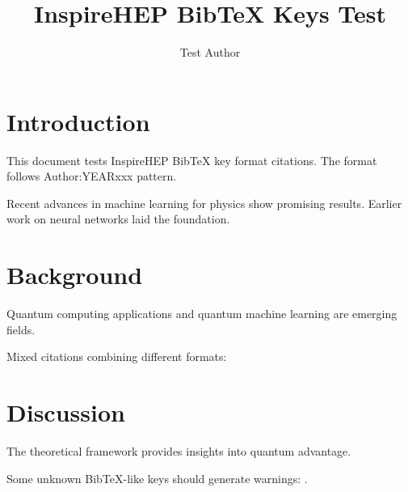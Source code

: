 \documentclass{article}
\title{InspireHEP BibTeX Keys Test}
\author{Test Author}
\begin{document}
\maketitle

\section{Introduction}

This document tests InspireHEP BibTeX key format citations. The format follows Author:YEARxxx pattern.

Recent advances in machine learning for physics \cite{Dumitrescu:2025vfp} show promising results. Earlier work on neural networks \cite{Carleo:2019ptp} laid the foundation.

\section{Background}

Quantum computing applications \cite{Preskill:2018fag} and quantum machine learning \cite{Biamonte:2017zfb} are emerging fields.

Mixed citations combining different formats:
\cite{Dumitrescu:2025vfp,2112.00006,1724847,Carleo:2019ptp}

\section{Discussion}

The theoretical framework \cite{Preskill:2018fag,hep-th/9803103} provides insights into quantum advantage.

Some unknown BibTeX-like keys should generate warnings: \cite{Unknown:2023abc,FakeAuthor:2024xyz}.



\end{document}
